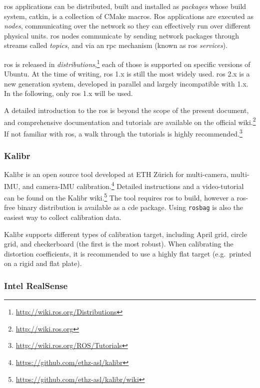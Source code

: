 \documentclass[11pt, letterpaper, twoside]{article}
\begin{document}
\gls{ros} applications can be distributed, built and installed as
\textit{packages} whose build system, catkin, is a collection of CMake macros.
Ros applications are executed as \textit{nodes}, communicating over the network
so they can effectively run over different physical units. \gls{ros} nodes
communicate by sending network packages through streams called \textit{topics},
and via an \gls{rpc} mechanism (known as \gls{ros} \textit{services}).

\gls{ros} is released in
\textit{distributions},\footnote{\url{http://wiki.ros.org/Distributions}} each
of those is supported on specific versions of Ubuntu. At the time of writing,
\gls{ros} 1.x is still the most widely used. \gls{ros} 2.x is a new generation
system, developed in parallel and largely incompatible with 1.x. In the
following, only \gls{ros} 1.x will be used.

A detailed introduction to the \gls{ros} is beyond the scope of the present
document, and comprehensive documentation and tutorials are available on the
official wiki.\footnote{\url{http://wiki.ros.org}} If not familiar with
\gls{ros}, a walk through the tutorials is highly
recommended.\footnote{\url{http://wiki.ros.org/ROS/Tutorials}}

\subsubsection{Kalibr}\label{sec:kalibr}

Kalibr is an open source tool developed at ETH Zürich for multi-camera,
multi-IMU, and camera-IMU
calibration.\footnote{\label{note:kalibr}\url{https://github.com/ethz-asl/kalibr}} Detailed
instructions and a video-tutorial can be found on the Kalibr
wiki.\footnote{\url{https://github.com/ethz-asl/kalibr/wiki}} The tool requires
\gls{ros} to build, however a \gls{ros}-free binary distribution is available
as a \gls{cde} package. Using \texttt{rosbag} is also the easiest way to
collect calibration data.

Kalibr supports different types of calibration target, including April grid,
circle grid, and checkerboard (the first is the most robust). When calibrating
the distortion coefficients, it is recommended to use a highly flat target
(e.g.\ printed on a rigid and flat plate).

\subsubsection{Intel RealSense}
\end{document}
